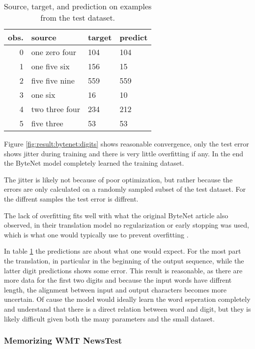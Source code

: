 \begin{table}[h]
\centering
\begin{tabular}{r|p{3.3cm} p{3.3cm} p{3.3cm}}
	obs. & source & target & predict\\ \hline
  0 & one zero four & 104 & 104 \\
  1 & one five six & 156 & 15 \\
  2 & five five nine & 559 & 559 \\
  3 & one six & 16 & 10 \\
  4 & two three four & 234 & 212 \\
  5 & five three & 53 & 53
\end{tabular}
\caption{Source, target, and prediction on examples from the test dataset.}
\label{table:result:bytenet:digits}
\end{table}

Figure \ref{fig:result:bytenet:digits} shows reasonable convergence, only the test error shows jitter during training and there is very little overfitting if any. In the end the ByteNet model completely learned the training dataset.

The jitter is likely not because of poor optimization, but rather because the errors are only calculated on a randomly sampled subset of the test dataset. For the diffrent samples the test error is diffrent.

The lack of overfitting fits well with what the original ByteNet article also observed, in their translation model no regularization or early stopping was used, which is what one would typically use to prevent overfitting \cite{bytenet}.

In table \ref{table:result:bytenet:digits} the predictions are about what one would expect. For the most part the translation, in particular in the beginning of the output sequence, while the latter digit predictions shows some error. This result is reasonable, as there are more data for the first two digits and because the input words have diffrent length, the alignment between input and output characters becomes more uncertain. Of cause the model would ideally learn the word seperation completely and understand that there is a direct relation between word and digit, but they is likely difficult given both the many parameters and the small dataset.

\clearpage
\subsubsection{Memorizing WMT NewsTest}

